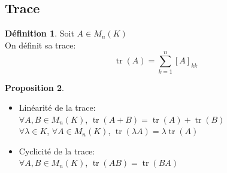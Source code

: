 \documentclass[10pt,a4paper]{article}
\theoremstyle{definition}
\newtheorem{proposition}{Proposition}[section]
\newtheorem{definition}[proposition]{Définition}
\DeclareMathOperator{\tr}{tr}
\begin{document}
\subsection{Trace}
\begin{definition}
Soit $A \in M_n(K)$ \\
On définit sa trace: 
\[\tr(A) = \sum_{k = 1}^n [A]_{kk}\]
\end{definition}
\begin{proposition}
\hfill
\begin{itemize}
\item Linéarité de la trace: \\
$\forall A, B \in M_n(K)$, $\tr(A + B) = \tr(A) + \tr(B)$ \\
$\forall \lambda \in K$, $\forall A \in M_n(K)$, $\tr(\lambda A) = \lambda \tr(A)$
\item Cyclicité de la trace: \\
$\forall A, B \in M_n(K)$, $\tr(AB) = \tr(BA)$
\end{itemize}
\end{proposition}
\end{document}
